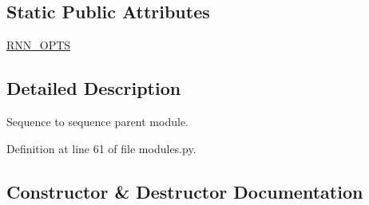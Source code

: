 \subsection*{Static Public Attributes}
\begin{DoxyCompactItemize}
\item 
\hyperlink{classparlai_1_1agents_1_1seq2seq_1_1modules_1_1Seq2seq_a45015a2bc7b04a1f8873a2cf7687da72}{R\+N\+N\+\_\+\+O\+P\+TS}
\end{DoxyCompactItemize}


\subsection{Detailed Description}
\begin{DoxyVerb}Sequence to sequence parent module.
\end{DoxyVerb}
 

Definition at line 61 of file modules.\+py.



\subsection{Constructor \& Destructor Documentation}
\mbox{\label{classparlai_1_1agents_1_1seq2seq_1_1modules_1_1Seq2seq_a8e8ad02405bcaf384e154a0e238fc10d}} 
